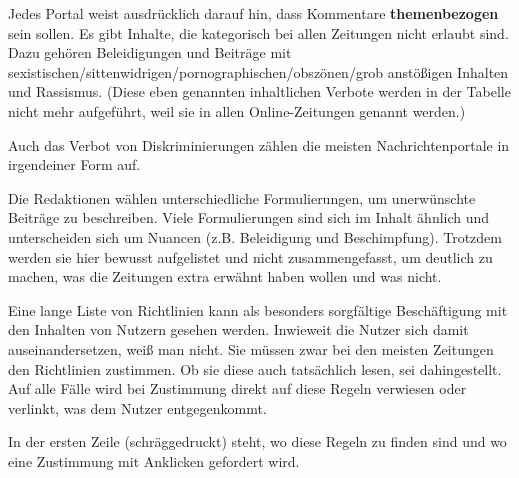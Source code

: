 Jedes Portal weist ausdrücklich darauf hin, dass Kommentare {\bfseries
themenbezogen} sein sollen.  Es gibt Inhalte, die kategorisch bei allen
Zeitungen nicht erlaubt sind. Dazu gehören Beleidigungen und Beiträge mit
se\-xi\-sti\-schen/sit\-ten\-wi\-dri\-gen/por\-no\-gra\-phi\-schen/obs\-zö\-nen/grob
anstößigen Inhalten und Rassismus. (Diese eben genannten inhaltlichen Verbote
werden in der Tabelle nicht mehr aufgeführt, weil sie in allen Online-Zeitungen
genannt werden.)

Auch das Verbot von Diskriminierungen zählen die meisten Nachrichtenportale in
irgendeiner Form auf.

Die Redaktionen wählen unterschiedliche Formulierungen, um unerwünschte Beiträge
zu beschreiben. Viele Formulierungen sind sich im Inhalt ähnlich  und
unterscheiden sich um Nuancen (z.B. Beleidigung und Beschimpfung). Trotzdem
werden sie hier bewusst aufgelistet und nicht zusammengefasst, um deutlich zu
machen, was die Zeitungen extra erwähnt haben wollen und was nicht.

Eine lange Liste von Richtlinien kann als besonders sorgfältige Beschäftigung
mit den Inhalten von Nutzern gesehen werden. Inwieweit die Nutzer sich damit
auseinandersetzen, weiß man nicht. Sie müssen zwar bei den meisten Zeitungen den
Richtlinien zustimmen. Ob sie diese auch tatsächlich lesen, sei dahingestellt.
Auf alle Fälle wird bei Zustimmung direkt auf diese Regeln verwiesen oder
verlinkt, was dem Nutzer entgegenkommt.

In der ersten Zeile (schräggedruckt) steht, wo diese Regeln zu finden sind und
wo eine Zustimmung mit Anklicken gefordert wird.
\newpage

